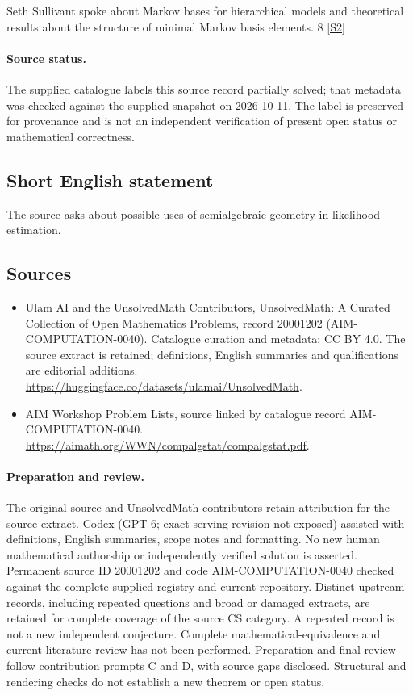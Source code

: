 \documentclass[11pt]{article}
\newcommand{\sref}[2]{\hyperlink{source:#1:#2}{[S#2]}}
\begin{document}
Seth Sullivant spoke about Markov bases for hierarchical models and theoretical results about the structure of minimal Markov basis elements. 8 \sref{20001202}{2}
\paragraph{Source status.}
The supplied catalogue labels this source record partially solved; that metadata was checked against the supplied snapshot on 2026-10-11. The label is preserved for provenance and is not an independent verification of present open status or mathematical correctness.
\subsection{Short English statement}
The source asks about possible uses of semialgebraic geometry in likelihood estimation.
\subsection{Sources}
\begin{itemize}
\item[\hypertarget{source:20001202:1}{S1}] Ulam AI and the UnsolvedMath Contributors, UnsolvedMath: A Curated Collection of Open Mathematics Problems, record 20001202 (AIM-COMPUTATION-0040). Catalogue curation and metadata: CC BY 4.0. The source extract is retained; definitions, English summaries and qualifications are editorial additions.
\url{https://huggingface.co/datasets/ulamai/UnsolvedMath}.
\item[\hypertarget{source:20001202:2}{S2}] AIM Workshop Problem Lists, source linked by catalogue record AIM-COMPUTATION-0040.
\url{https://aimath.org/WWN/compalgstat/compalgstat.pdf}.
\end{itemize}
\paragraph{Preparation and review.}
The original source and UnsolvedMath contributors retain attribution for the source extract. Codex (GPT-6; exact serving revision not exposed) assisted with definitions, English summaries, scope notes and formatting. No new human mathematical authorship or independently verified solution is asserted. Permanent source ID 20001202 and code AIM-COMPUTATION-0040 checked against the complete supplied registry and current repository. Distinct upstream records, including repeated questions and broad or damaged extracts, are retained for complete coverage of the source CS category. A repeated record is not a new independent conjecture. Complete mathematical-equivalence and current-literature review has not been performed. Preparation and final review follow contribution prompts C and D, with source gaps disclosed. Structural and rendering checks do not establish a new theorem or open status.
\label{end:20001202}
\end{document}
